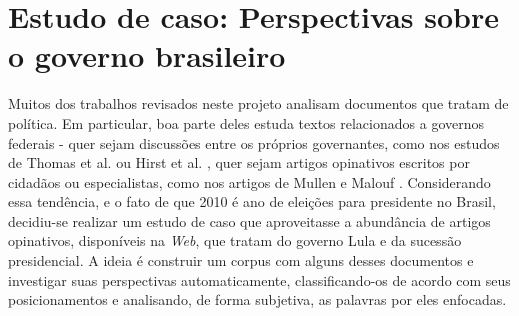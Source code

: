\chapter{Estudo de caso: Perspectivas sobre o governo brasileiro}




Muitos dos trabalhos revisados neste projeto analisam documentos que tratam de política. Em particular, boa parte deles estuda textos relacionados a governos federais - quer sejam discussões entre os próprios governantes, como nos estudos de Thomas et al. \cite{get-out-the-vote} ou Hirst et al. \cite{hirst-et-al}, quer sejam artigos opinativos escritos por cidadãos ou especialistas, como nos artigos de Mullen e Malouf \cite{aaai-politics} \cite{malouf-taking_sides}. Considerando essa tendência, e o fato de que 2010 é ano de eleições para presidente no Brasil, decidiu-se realizar um estudo de caso que aproveitasse a abundância de artigos opinativos, disponíveis na \emph{Web}, que tratam do governo Lula e da sucessão presidencial. A ideia é construir um corpus com alguns desses documentos e investigar suas perspectivas automaticamente, classificando-os de acordo com seus posicionamentos e analisando, de forma subjetiva, as palavras por eles enfocadas.

